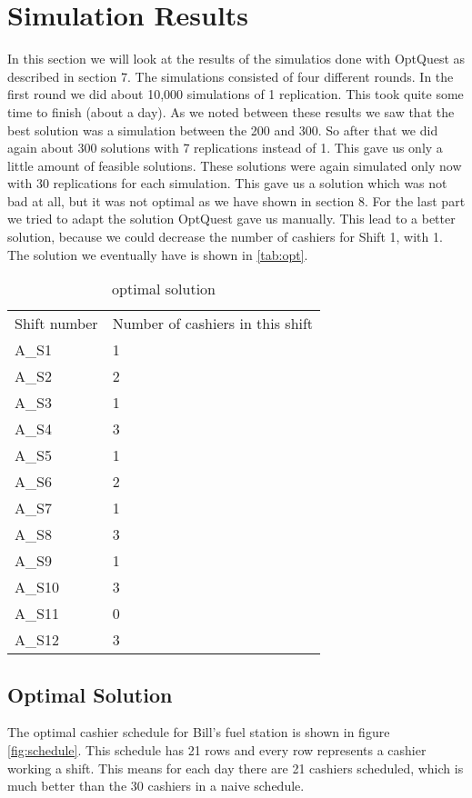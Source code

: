 \section{Simulation Results}\label{sec:simulationresults}
In this section we will look at the results of the simulatios done with OptQuest as described in section 7. 
The simulations consisted of four different rounds. 
In the first round we did about 10,000 simulations of 1 replication. 
This took quite some time to finish (about a day).
As we noted between these results we saw that the best solution was a simulation between the 200 and 300.
So after that we did again about 300 solutions with 7 replications instead of 1.
This gave us only a little amount of feasible solutions. 
These solutions were again simulated only now with 30 replications for each simulation.
This gave us a solution which was not bad at all, but it was not optimal as we have shown in section 8.
For the last part we tried to adapt the solution OptQuest gave us manually.
This lead to a better solution, because we could decrease the number of cashiers for Shift 1, with 1.
The solution we eventually have is shown in \autoref{tab:opt}.

\begin{table}
	\centering
	\caption{optimal solution}
	\begin{tabular}{l | l}
		Shift number & Number of cashiers in this shift\\
		A\_S1 & 1 \\
		A\_S2 & 2 \\
		A\_S3 & 1 \\
		A\_S4 & 3 \\
		A\_S5 & 1 \\
		A\_S6 & 2 \\
		A\_S7 & 1 \\
		A\_S8 & 3 \\
		A\_S9 & 1 \\
		A\_S10 & 3 \\
		A\_S11 & 0 \\
		A\_S12 & 3 \\
	\end{tabular}
	\label{tab:opt}
\end{table}

\subsection{Optimal Solution}
The optimal cashier schedule for Bill's fuel station is shown in figure \ref{fig:schedule}.
This schedule has 21 rows and every row represents a cashier working a shift.
This means for each day there are 21 cashiers scheduled, which is much better than the 30 cashiers in a naive schedule.


